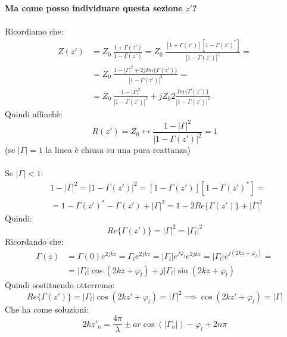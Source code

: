 \textbf{Ma come posso individuare questa sezione $z'$?\\ \\
}Ricordiamo che:
\begin{equation*}
\begin{aligned}
     Z(z') &= Z_0 \ \frac{1 + \Gamma(z')}{1 - \Gamma(z')} = Z_0 \ \frac{[1 + \Gamma(z')][1 - {\Gamma(z')}^*]}{{|1 - \Gamma(z')|}^2} =\\
     &= Z_0 \ \frac{1 - |\Gamma|^2 + 2j Im\{\Gamma(z')\}}{|1 - \Gamma(z')|^2} =\\
     &=Z_0 \ \frac{1 - |\Gamma|^2 }{|1 - \Gamma(z')|^2} + j Z_0 2 \frac{Im\{\Gamma(z')\}}{|1 - \Gamma(z')|^2}
\end{aligned}
\end{equation*}
Quindi affinchè:
\begin{equation*}
    R(z') = Z_0 \leftrightarrow \frac{1 - |\Gamma|^2 }{|1 - \Gamma(z')|^2} = 1
\end{equation*}
(se $|\Gamma|=1$ la linea è chiusa su una pura reattanza)\\ \\
Se $|\Gamma|<1$:
\begin{equation*}
    \begin{aligned}
    &1 - {|\Gamma|}^2 = {|1 - \Gamma(z')|}^2 = [1 - \Gamma(z')][1 - {\Gamma(z')}^*] = \\
    &= 1 - {\Gamma(z')}^* - \Gamma(z') + {|\Gamma|}^2 = 1 - 2Re\{\Gamma(z')\} + {|\Gamma|}^2
    \end{aligned}
\end{equation*}
Quindi:
\begin{equation*}
    Re\{\Gamma(z')\} = |\Gamma|^2 = |\Gamma_l|^2
\end{equation*}
Ricordando che:
\begin{equation*}
    \begin{aligned}
    \Gamma(z) &= \Gamma(0) e^{2jkz} = \Gamma_l e^{2jkz} = |\Gamma_l| e^{j\varphi_l} e^{2jkz} =|\Gamma_l| e^{j(2kz +\varphi_l)} =\\
    &= |\Gamma_l| \cos(2kz +\varphi_l) + j |\Gamma_l| \sin(2kz +\varphi_l)
    \end{aligned}
\end{equation*}
Quindi sostituendo otterremo:
\begin{equation*}
    Re\{\Gamma(z')\} = |\Gamma_l| \cos(2kz' +\varphi_l) = |\Gamma|^2 \implies \cos(2kz' +\varphi_l) = |\Gamma|
\end{equation*}
Che ha come soluzioni:
\begin{equation*}
    2k z'_n = \frac{4\pi}{\lambda} \pm ar\cos(|\Gamma_n|) - \varphi_l + 2n\pi
\end{equation*}
